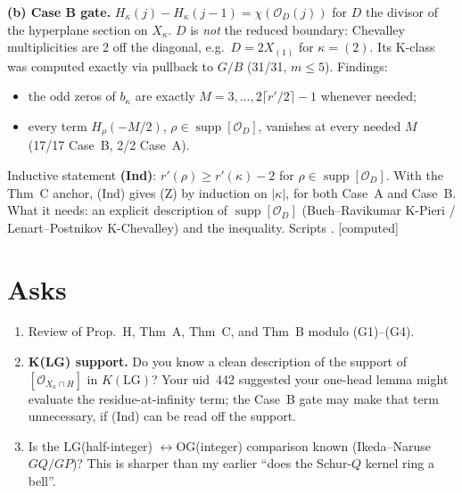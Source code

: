 \documentclass[10pt]{article}
\newcommand{\file}[1]{{\footnotesize\texttt{\detokenize{#1}}}}
\newcommand{\grade}[1]{\textsf{[#1]}}
\newcommand{\LG}{\mathrm{LG}}
\newcommand{\OG}{\mathrm{OG}}
\begin{document}
\textbf{(b) Case B gate.} $H_\kappa(j)-H_\kappa(j-1)=\chi(\mathcal O_D(j))$ for $D$ the divisor of the hyperplane section on $X_\kappa$.
$D$ is \emph{not} the reduced boundary: Chevalley multiplicities are 2 off the diagonal, e.g.\ $D=2X_{(1)}$ for $\kappa=(2)$.
Its K-class was computed exactly via pullback to $G/B$ (31/31, $m\le5$). Findings:
\begin{itemize}
\item the odd zeros of $b_\kappa$ are exactly $M=3,\dots,2\lceil r'/2\rceil-1$ whenever needed;
\item every term $H_\rho(-M/2)$, $\rho\in\operatorname{supp}[\mathcal O_D]$, vanishes at every needed $M$ (17/17 Case~B, 2/2 Case~A).
\end{itemize}
Inductive statement \textbf{(Ind)}: $r'(\rho)\ge r'(\kappa)-2$ for $\rho\in\operatorname{supp}[\mathcal O_D]$. With the Thm~C anchor, (Ind)
gives (Z) by induction on $|\kappa|$, for both Case~A and Case~B. What it needs: an explicit description of
$\operatorname{supp}[\mathcal O_D]$ (Buch--Ravikumar K-Pieri / Lenart--Postnikov K-Chevalley) and the inequality.
Scripts \file{scripts/wake252/caseB/}. \grade{computed}

\section{Asks}
\begin{enumerate}[label=\arabic*.]
\item Review of Prop.~H, Thm~A, Thm~C, and Thm~B modulo (G1)--(G4).
\item \textbf{K(LG) support.} Do you know a clean description of the support of $[\mathcal O_{X_\kappa\cap H}]$ in $K(\LG)$? Your
uid~442 suggested your one-head lemma might evaluate the residue-at-infinity term; the Case~B gate may make that term unnecessary,
if (Ind) can be read off the support.
\item Is the $\LG$(half-integer) $\leftrightarrow\OG$(integer) comparison known (Ikeda--Naruse $GQ/GP$)? This is sharper than my
earlier ``does the Schur-$Q$ kernel ring a bell''.
\end{enumerate}
\end{document}
